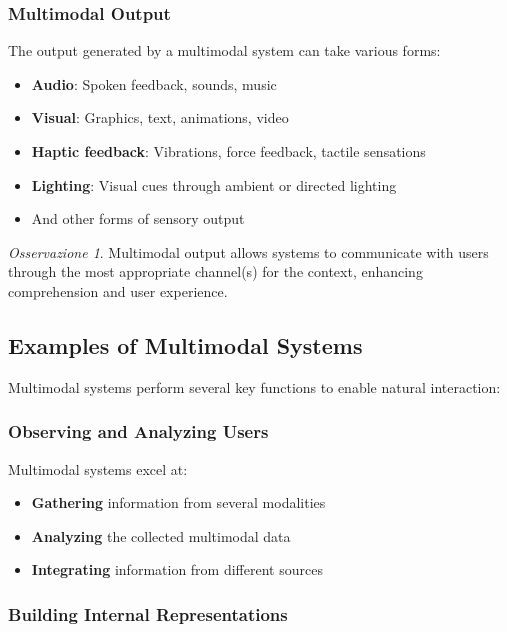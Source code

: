 \documentclass[11pt,a4paper]{article}
\theoremstyle{definition}
\theoremstyle{plain}
\theoremstyle{remark}
\newtheorem*{observation}{Osservazione}
\begin{document}
\subsubsection{Multimodal Output}

The output generated by a multimodal system can take various forms:

\begin{itemize}
    \item \textbf{Audio}: Spoken feedback, sounds, music
    \item \textbf{Visual}: Graphics, text, animations, video
    \item \textbf{Haptic feedback}: Vibrations, force feedback, tactile sensations
    \item \textbf{Lighting}: Visual cues through ambient or directed lighting
    \item And other forms of sensory output
\end{itemize}

\begin{observation}
Multimodal output allows systems to communicate with users through the most appropriate channel(s) for the context, enhancing comprehension and user experience.
\end{observation}

\subsection{Examples of Multimodal Systems}

Multimodal systems perform several key functions to enable natural interaction:

\subsubsection{Observing and Analyzing Users}

Multimodal systems excel at:

\begin{itemize}
    \item \textbf{Gathering} information from several modalities
    \item \textbf{Analyzing} the collected multimodal data
    \item \textbf{Integrating} information from different sources
\end{itemize}

\subsubsection{Building Internal Representations}
\end{document}
